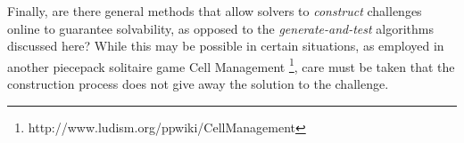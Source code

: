 \documentclass[journal]{IEEEtran}
\begin{document}
Finally, are there general methods that allow solvers to {\it construct} challenges online to guarantee solvability, as opposed to the {\it generate-and-test} algorithms discussed here? While this may be possible in certain situations, as employed in another piecepack solitaire game Cell Management \footnote{http://www.ludism.org/ppwiki/CellManagement}, care must be taken that the construction process does not give away the solution to the challenge.






%
%

\end{document}
